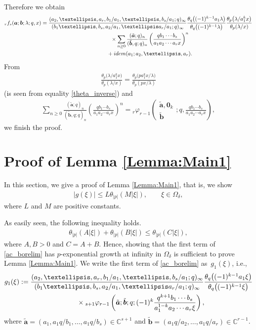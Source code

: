\documentclass[11pt]{article}
\numberwithin{equation}{section}
\newcommand{\idem}{{\rm idem}}
\begin{document}
Therefore we obtain
\begin{gather*}
{}_rf_s(\bm{a};\bm{b};\lambda;q,x)= \frac{(a_2,\ldots,a_r,b_1/a_1,\ldots,b_{s}/a_1;q)_\infty}{(b_1\ldots,b_s,a_2/a_1,\ldots a_r/a_1;q)_\infty}\frac{\theta_q\big((-1)^{k-1}a_1\lambda\big)}{\theta_q\big((-1)^{k-1}\lambda\big)}\frac{\theta_p\big(\lambda/a_1^kx\big)}{\theta_p(\lambda/x)}\\
\hphantom{{}_rf_s(\bm{a};\bm{b};\lambda;q,x)=}{} \times\sum_{n\ge0}\frac{(\tilde{\bm{a}};q)_n}{(\tilde{\bm{b}},q;q)_n}\left(\frac{qb_1\cdots b_s}{a_1a_2\cdots a_rx}\right)^n\\
\hphantom{{}_rf_s(\bm{a};\bm{b};\lambda;q,x)=}{} +\idem(a_1;a_2,\ldots,a_r).
\end{gather*}
From
\begin{gather*}
\frac{\theta_p\big(\lambda/a_1^kx\big)}{\theta_p(\lambda/x)}=\frac{\theta_p\big(pa_1^kx/\lambda\big)}{\theta_p(px/\lambda)}
\end{gather*}
(is seen from equality \eqref{theta_inverse}) and
\begin{gather*}
\sum_{n\ge0}\frac{(\tilde{\bm{a}};q)_n}{(\tilde{\bm{b}},q;q)_n}\left(\frac{qb_1\cdots b_s}{a_1a_2\cdots a_rx}\right)^n={}_r\varphi_{r-1}\left(
\begin{matrix}\tilde{\bm{a}},\bm{0}_k\\
\tilde{\bm{b}}
\end{matrix};q,\frac{qb_1\cdots b_s}{a_1a_2\cdots a_rx}\right),
\end{gather*}
we finish the proof.
\section{Proof of Lemma \ref{Lemma:Main1}}\label{Section:Proof_Lemma:Main1}
In this section, we give a proof of Lemma \ref{Lemma:Main1}, that is, we show
\begin{gather*}
\vert g(\xi)\vert\le L \theta_{\vert p\vert}(M\vert \xi\vert),\qquad \xi\in\Omega_\delta,
\end{gather*}
where $L$ and $M$ are positive constants.

As easily seen, the following inequality holds.
\begin{gather*}
\theta_{|p|}(A|\xi|)+\theta_{|p|}(B|\xi|)\le \theta_{|p|}(C|\xi|),
\end{gather*}
where $A, B>0$ and $C=A+B$. Hence, showing that the first term of \eqref{ac_borelim} has $p$-exponential growth at infinity in $\Omega_\delta$ is sufficient to prove Lemma \ref{Lemma:Main1}. We write the first term of \eqref{ac_borelim} as~$g_1(\xi)$, i.e.,
\begin{gather*}
g_1(\xi):=\frac{(a_2,\ldots,a_r,b_1/a_1,\ldots,b_{s}/a_1;q)_\infty}{(b_1\ldots,b_s,a_2/a_1,\ldots a_r/a_1;q)_\infty}\frac{\theta_q\big((-1)^{k-1}a_1\xi\big)}{\theta_q\big((-1)^{k-1}\xi\big)}\\
\hphantom{g_1(\xi):=}{}\times {}_{s+1}\varphi_{r-1}\left(\tilde{\bm{a}};\tilde{\bm{b}};q;(-1)^k\frac{q^{k+1}b_1\cdots b_s}{a_1^{1-k}a_2\cdots a_r\xi}\right),
\end{gather*}
where $\tilde{\bm{a}}=(a_1,a_1q/b_1,\ldots,a_1q/b_s)\in\mathbb{C}^{s+1}$ and $\tilde{\bm{b}}=(a_1q/a_2,\ldots,a_1q/a_r)\in\mathbb{C}^{r-1}$.
\end{document}
